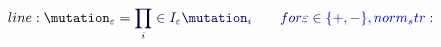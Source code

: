 \documentclass[12pt]{article}
\begin{document}
\makeatletter
\renewcommand*{\@textcolor}[3]{%
  \protect\leavevmode
  \begingroup
    \color#1{#2}#3%
  \endgroup
}
\makeatother
\begin{displaymath}
\mathcolor[RGB]{0,0,15}{line:
\mutation_{\varepsilon}} \mathcolor[RGB]{0,0,30}{=} \mathcolor[RGB]{0,0,45}{\prod_{i} \mathcolor[RGB]{0,0,60}{\in} \mathcolor[RGB]{0,0,75}{I_{\varepsilon}}} \mathcolor[RGB]{0,0,90}{\mutation_i} \qquad \mathcolor[RGB]{0,0,105}{\text{} \mathcolor[RGB]{0,0,120}{for} } \mathcolor[RGB]{0,0,135}{\varepsilon} \mathcolor[RGB]{0,0,150}{\in} \mathcolor[RGB]{0,0,165}{\{} \mathcolor[RGB]{0,0,180}{+,} \mathcolor[RGB]{0,0,195}{-\},

norm_str:}
\end{displaymath}
\end{document}
